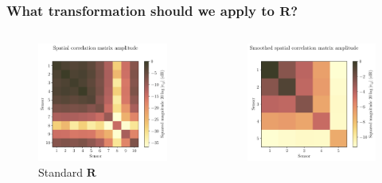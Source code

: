 \documentclass[UKenglish,8pt,aspectratio=1610]{beamer}
\begin{document}
\begin{frame}
	\frametitle{What transformation should we apply to $\mathbf{R}$? \cite{twoDecades,uncini,Johnson1993ArraySP}}
	\vspace{-15pt}
	\begin{columns}
		\begin{column}{0.33\textwidth}
			\begin{figure}[h!]
				\centering
				\includegraphics[scale=0.3]{question8/matrices/spatial_correlation_matrix_amplitude}
				\caption{Standard $\mathbf{R}$}
			\end{figure}
		\end{column}
		\begin{column}{0.33\textwidth}
			\begin{figure}[h!]
				\centering
				\includegraphics[scale=0.3]{question8/matrices/smoothed_spatial_correlation_matrix_amplitude}

\end{figure}
\end{column}
\end{columns}
\end{frame}
\end{document}
